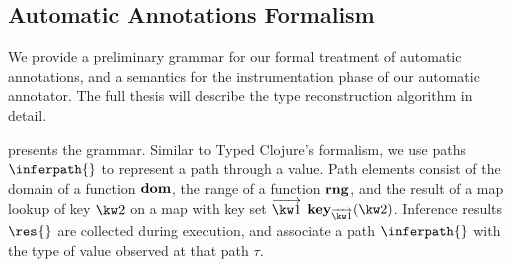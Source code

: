 \documentclass[9pt]{extarticle}
\begin{document}
%
%
%
%
%
%

\subsection{Automatic Annotations Formalism}

We provide a preliminary grammar for our formal treatment of automatic
annotations, and a semantics for the instrumentation phase
of our automatic annotator.
The full thesis will describe the type reconstruction algorithm in
detail.

 presents the grammar. Similar to Typed Clojure's
formalism, we use paths $\inferpath{}$ to represent a path through
a value. Path elements consist of the domain of a function $\textbf{dom}{}$,
the range of a function $\textbf{rng}{}$, and the result of a map lookup 
of key ${\kw2{}}$ on a map with key set ${\overrightarrow{\kw1{}}}$
$\inferkeype{\overrightarrow{\kw1{}}}{\kw2{}}$.
Inference results $\res{}$ are collected during execution, and
associate a path $\inferpath{}$ with the type of value observed
at that path $\tau$.
\end{document}
